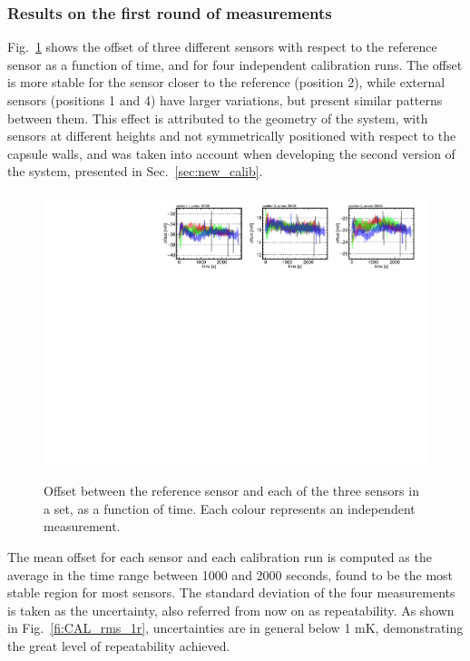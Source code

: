\subsubsection{Results on the first round of measurements}
\noindent Fig.~\ref{fi:CAL_offset_example} shows the offset of three different sensors with respect to the reference sensor as a function of time, and for four independent calibration runs. The offset is more stable for the sensor closer to the reference (position 2), while external sensors (positions 1 and 4) have larger variations, but present similar patterns between them. This effect is attributed to the geometry of the system, with sensors at different heights and not symmetrically positioned with respect to the capsule walls, and was taken into account when developing the second version of the system, presented in Sec.~\ref{sec:new_calib}. 

\label{sec:results_first_round}
\begin{figure}[htbp]
\centering
{\includegraphics[width=\textwidth]{images/figure_10.pdf}}
\caption{Offset between the reference sensor and each of the three sensors in a set, as a function of time. Each colour represents an independent measurement.}
\label{fi:CAL_offset_example}
\end{figure}

The mean offset for each sensor and each calibration run is computed as the average in the time range between 1000 and 2000 seconds, found to be the most stable region for most sensors. The standard deviation of the four measurements is taken as the uncertainty, also referred from now on as repeatability. As shown in Fig.~\ref{fi:CAL_rms_1r}, uncertainties are in general below 1 mK, demonstrating the great level of repeatability achieved. 

